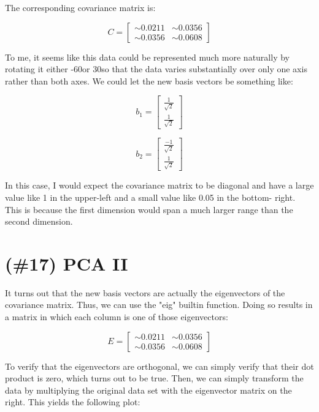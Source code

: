 \documentclass{article}
\begin{document}
The corresponding covariance matrix is:

$$
C = \begin{bmatrix}
\sim 0.0211 & \sim 0.0356 \\
\sim 0.0356 & \sim 0.0608
\end{bmatrix}
$$

To me, it seems like this data could be represented much more naturally by 
rotating it either -60\degree or 30\degree so that the data varies substantially 
over only one axis rather than both axes. We could let the new basis vectors be 
something like:

$$
b_{1} = \begin{bmatrix}
\frac{1}{\sqrt{2}} \\
\frac{1}{\sqrt{2}}
\end{bmatrix}
$$

$$
b_{2} = \begin{bmatrix}
\frac{-1}{\sqrt{2}} \\
\frac{1}{\sqrt{2}}
\end{bmatrix}
$$

In this case, I would expect the covariance matrix to be diagonal and have a 
large value like 1 in the upper-left and a small value like 0.05 in the bottom-
right. This is because the first dimension would span a much larger range than 
the second dimension.

\section{(\#17) PCA II}

It turns out that the new basis vectors are actually the eigenvectors of the 
covariance matrix. Thus, we can use the "eig" builtin function. Doing so 
results in a matrix in which each column is one of those eigenvectors:

$$
E = \begin{bmatrix}
\sim 0.0211 & \sim 0.0356 \\
\sim 0.0356 & \sim 0.0608
\end{bmatrix}
$$

To verify that the eigenvectors are orthogonal, we can simply verify that their 
dot product is zero, which turns out to be true. Then, we can simply transform 
the data by multiplying the original data set with the eigenvector matrix on the 
right. This yields the following plot:
\end{document}

